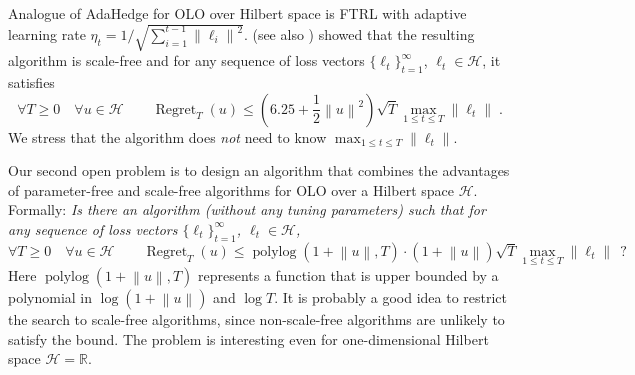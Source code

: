 \documentclass{colt2016} %
\DeclareMathOperator{\Regret}{Regret}
\DeclareMathOperator{\polylog}{polylog}
\newcommand{\R}{\mathbb{R}}     %
\renewcommand{\H}{\mathcal{H}}  %
\newcommand{\norm}[1]{\left\|{#1}\right\|}
\begin{document}
Analogue of AdaHedge for OLO over Hilbert space is FTRL with adaptive learning
rate $\eta_t = 1/\sqrt{\sum_{i=1}^{t-1} \norm{\ell_i}^2}$.
\cite{Orabona-Pal-2015} (see also \cite{Orabona-Pal-2016-scale-free}) showed
that the resulting algorithm is scale-free and for any sequence of loss vectors
$\{\ell_t\}_{t=1}^\infty$, $\ell_t \in \H$, it satisfies
$$
\forall T \ge 0 \quad \forall u \in \H \qquad \Regret_T(u) \le \left(6.25 + \frac{1}{2}\norm{u}^2 \right) \sqrt{T} \max_{1 \le t \le T} \norm{\ell_t} \; .
$$
We stress that the algorithm does \emph{not} need to know $\max_{1 \le t \le T} \norm{\ell_t}$.

Our second open problem is to design an algorithm that combines the advantages
of parameter-free and scale-free algorithms for OLO over a Hilbert space $\H$.
Formally: \emph{Is there an algorithm (without any tuning parameters) such that
for any sequence of loss vectors $\{\ell_t\}_{t=1}^\infty$, $\ell_t \in \H$,}
$$
\forall T \ge 0 \quad \forall u \in \H \qquad
\Regret_T(u) \le \polylog(1 + \norm{u}, T) \cdot (1 + \norm{u}) \sqrt{T} \max_{1 \le t \le T} \norm{\ell_t} \ \ ?
$$
Here $\polylog(1 + \norm{u}, T)$ represents a function that is upper bounded by
a polynomial in $\log(1+\norm{u})$ and $\log T$. It is probably a good idea
to restrict the search to scale-free algorithms, since non-scale-free algorithms
are unlikely to satisfy the bound. The problem is interesting
even for one-dimensional Hilbert space $\H = \R$.


\end{document}
